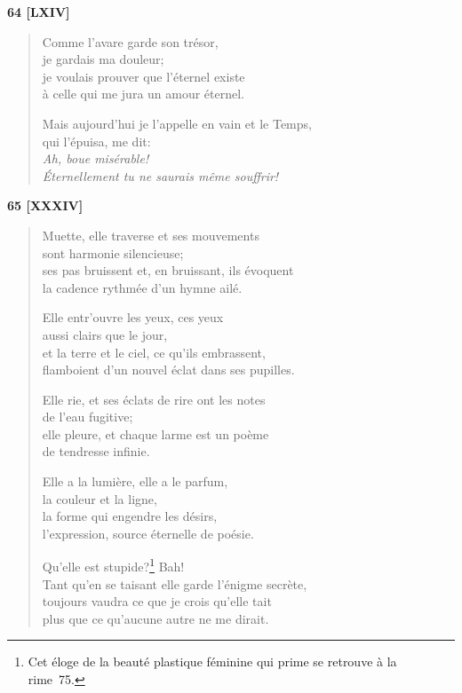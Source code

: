 
\begin{center}
  \textbf{64 [LXIV]}
\end{center}

\begin{verse}
  Comme l'avare garde son trésor, \\
  je gardais ma douleur; \\
  je voulais prouver que l'éternel existe \\
  à celle qui me jura un amour éternel.

  Mais aujourd'hui je l'appelle en vain et le Temps,\hspace*{-10pt} \\
  qui l'épuisa, me dit: \\
  \emph{Ah, boue misérable! \\
  Éternellement tu ne saurais même souffrir!}
\end{verse}

\bigskip

\begin{center}
  \textbf{65 [XXXIV]}
\end{center}

\begin{verse}
  Muette, elle traverse et ses mouvements \\
  sont harmonie silencieuse; \\
  ses pas bruissent et, en bruissant, ils évoquent \\
  la cadence rythmée d'un hymne ailé.

  Elle entr'ouvre les yeux, ces yeux \\
  aussi clairs que le jour, \\
  et la terre et le ciel, ce qu'ils embrassent, \\
  flamboient d'un nouvel éclat dans ses pupilles.

  Elle rie, et ses éclats de rire ont les notes \\
  de l'eau fugitive; \\
  elle pleure, et chaque larme est un poème \\
  de tendresse infinie.

  Elle a la lumière, elle a le parfum, \\
  la couleur et la ligne, \\
  la forme qui engendre les désirs, \\
  l'expression, source éternelle de poésie.

  Qu'elle est stupide?\footnote{Cet éloge de la beauté plastique
  féminine qui prime se retrouve à la rime~75.} Bah! \\
  Tant qu'en se taisant elle garde l'énigme secrète, \\
  toujours vaudra ce que je crois qu'elle tait \\
  plus que ce qu'aucune autre ne me dirait.
\end{verse}

